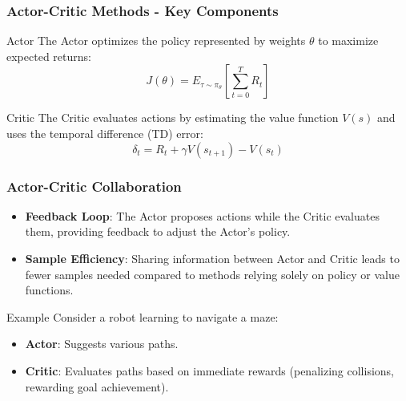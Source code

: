 \documentclass[aspectratio=169]{beamer}
\begin{document}
\begin{frame}[fragile]
    \frametitle{Actor-Critic Methods - Key Components}
    
    \begin{block}{Actor}
        The Actor optimizes the policy represented by weights \( \theta \) to maximize expected returns:
        \begin{equation}
            J(\theta) = E_{\tau \sim \pi_\theta} \left[ \sum_{t=0}^T R_t \right]
        \end{equation}
    \end{block}

    \begin{block}{Critic}
        The Critic evaluates actions by estimating the value function \( V(s) \) and uses the temporal difference (TD) error:
        \begin{equation}
            \delta_t = R_t + \gamma V(s_{t+1}) - V(s_t)
        \end{equation}
    \end{block}
\end{frame}

\begin{frame}[fragile]
    \frametitle{Actor-Critic Collaboration}

    \begin{itemize}
        \item \textbf{Feedback Loop}: The Actor proposes actions while the Critic evaluates them, providing feedback to adjust the Actor's policy.
        \item \textbf{Sample Efficiency}: Sharing information between Actor and Critic leads to fewer samples needed compared to methods relying solely on policy or value functions.
    \end{itemize}

    \begin{block}{Example}
        Consider a robot learning to navigate a maze:
        \begin{itemize}
            \item \textbf{Actor}: Suggests various paths.
            \item \textbf{Critic}: Evaluates paths based on immediate rewards (penalizing collisions, rewarding goal achievement).
        \end{itemize}
    \end{block}
\end{frame}
\end{document}
